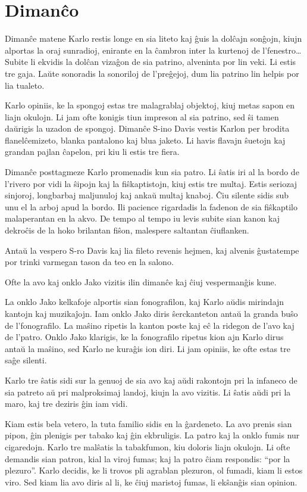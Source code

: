 \chapter{Dimanĉo}

Dimanĉe matene Karlo restis longe en sia liteto kaj ĝuis la dolĉajn sonĝojn, kiujn alportas la oraj sunradioj, enirante en la ĉambron inter la kurtenoj de l'fenestro\ldots{}Subite li ekvidis la dolĉan vizaĝon de sia patrino, alveninta por lin veki. Li estis tre gaja. Laŭte sonoradis la sonoriloj de l'preĝejoj, dum lia patrino lin helpis por lia tualeto.

Karlo opiniis, ke la spongoj estas tre malagrablaj objektoj, kiuj metas sapon en liajn okulojn. Li jam ofte konigis tiun impreson al sia patrino, sed ŝi tamen daŭrigis la uzadon de spongoj. Dimanĉe S-ino Davis vestis Karlon per brodita flanelĉemizeto, blanka pantalono kaj blua jaketo. Li havis flavajn ŝuetojn kaj grandan pajlan ĉapelon, pri kiu li estis tre fiera.

Dimanĉe posttagmeze Karlo promenadis kun sia patro. Li ŝatis iri al la bordo de l'rivero por vidi la ŝipojn kaj la fiŝkaptistojn, kiuj estis tre multaj. Estis seriozaj sinjoroj, longbarbaj maljunuloj kaj ankaŭ multaj knaboj. Ĉiu silente sidis sub unu el la arboj apud la bordo. Ili pacience rigardadis la fadenon de sia fiŝkaptilo malaperantan en la akvo. De tempo al tempo iu levis subite sian kanon kaj dekroĉis de la hoko brilantan fiŝon, malespere saltantan ĉiuflanken.

Antaŭ la vespero S-ro Davis kaj lia fileto revenis hejmen, kaj alvenis ĝustatempe por trinki varmegan tason da teo en la salono.

Ofte la avo kaj onklo Jako vizitis ilin dimanĉe kaj ĉiuj vespermanĝis kune.

La onklo Jako kelkafoje alportis sian fonografilon, kaj Karlo aŭdis mirindajn kantojn kaj muzikaĵojn. Iam onklo Jako diris ŝerckanteton antaŭ la granda buŝo de l'fonografilo. La maŝino ripetis la kanton poste kaj eĉ la ridegon de l'avo kaj de l'patro. Onklo Jako klarigis, ke la fonografilo ripetus kion ajn Karlo dirus antaŭ la maŝino, sed Karlo ne kuraĝis ion diri. Li jam opiniis, ke ofte estas tre saĝe silenti.

Karlo tre ŝatis sidi sur la genuoj de sia avo kaj aŭdi rakontojn pri la infaneco de sia patreto aŭ pri malproksimaj landoj, kiujn la avo vizitis. Li ŝatis aŭdi pri la maro, kaj tre deziris ĝin iam vidi.

Kiam estis bela vetero, la tuta familio sidis en la ĝardeneto. La avo prenis sian pipon, ĝin plenigis per tabako kaj ĝin ekbruligis. La patro kaj la onklo fumis nur cigaredojn. Karlo tre malŝatis la tabakfumon, kiu doloris liajn okulojn. Li ofte demandis sian patron, kial la viroj fumas; kaj la patro ĉiam respondis: ``por la plezuro''. Karlo decidis, ke li trovos pli agrablan plezuron, ol fumadi, kiam li estos viro. Sed kiam lia avo diris al li, ke ĉiuj maristoj fumas, li ekŝanĝis sian opinion.

